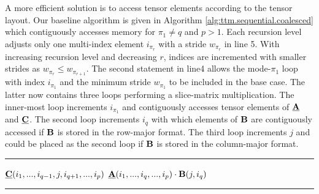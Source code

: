 A more efficient solution is to access tensor elements according to the tensor layout.
Our baseline algorithm is given in Algorithm \ref{alg:ttm.sequential.coalesced} which contiguously accesses memory for $\pi_1 \neq q$ and $p > 1$.
Each recursion level adjusts only one multi-index element $i_{\pi_r}$ with a stride $w_{\pi_r}$ in line 5.
With increasing recursion level and decreasing $r$, indices are incremented with smaller strides as $w_{\pi_r} \leq w_{\pi_{r+1}}$. 
The second  statement in line4 allows the mode-$\pi_1$ loop with index $i_{\pi_1}$ and the minimum stride $w_{\pi_1}$ to be included in the base case.
The latter now contains three loops performing a slice-matrix multiplication. 
The inner-most loop increments $i_{\pi_1}$ and contiguously accesses tensor elements of $\mubA$ and $\mubC$.
The second loop increments $i_q$ with which elements of $\mathbf{B}$ are contiguously accessed if $\mathbf{B}$ is stored in the row-major format.
The third loop increments $j$ and could be placed as the second loop if $\mathbf{B}$ is stored in the column-major format.

\begin{algorithm}[t]
\DontPrintSemicolon
{}
%
\footnotesize 
\SetAlgoVlined
\hrule
\BlankLine
{}
{
	{
	}
	{
		{
			\;
		}		
	}	
	\Else%
	{
		{
			{			
				{
					$\underline{\mathbf{C}}(i_1,...,i_{q-1},j,i_{q+1},...,i_{p})$ \ttt{+=} $\underline{\mathbf{A}}(i_1,...,i_q,...,i_p) \cdot \mathbf{B}(j,i_q)$\;
				}
			}
		}
	}
}
\BlankLine
\hrule
\caption{
\footnotesize %
Modified baseline algorithm with contiguous memory access for the tensor-matrix multiplication.
The tensor order $p$ must be greater than $1$ and the contraction mode $q$ must satisfy $1 \leq q \leq p$ and $\pi_1 \neq q$.
The initial call must happen with $r=p$ where $\mbn$ is the shape tuple of $\mubA$ and $m$ is the $q$-th dimension of $\mubC$. 
\label{alg:ttm.sequential.coalesced}
}
\end{algorithm}

